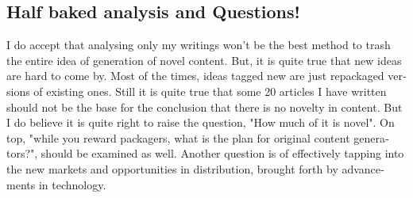 \begin{english}
\subsection*{Half baked analysis and Questions!}

I do accept that analysing only my writings won't be the best method to trash the entire idea of generation of novel content. But, it is quite true that new ideas are hard to come by. Most of the times, ideas tagged new are just repackaged versions of existing ones. Still it is quite true that some 20 articles I have written should not be the base for the conclusion that there is no novelty in content. But I do believe it is quite right to raise the question, "How much of it is novel". On top, "while you reward packagers, what is the plan for original content generators?", should be examined as well. Another question is of effectively tapping into the new markets and opportunities in distribution, brought forth by advancements in technology.
\end{english}
\newpage
